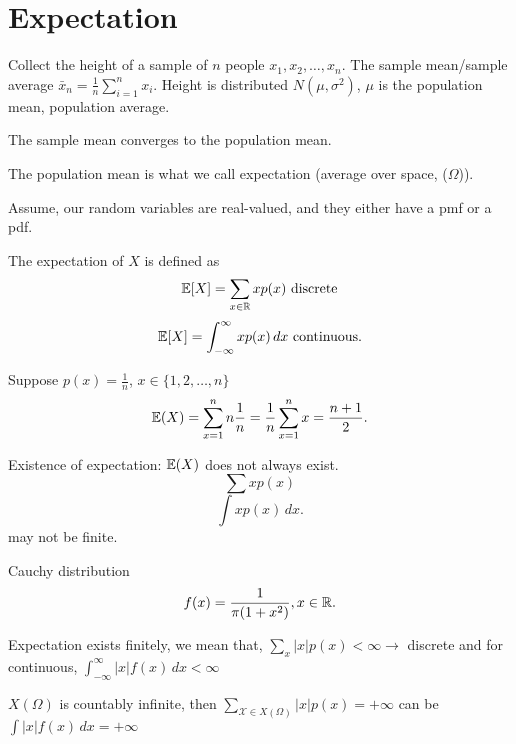 \documentclass[10pt, a4paper]{article}
\begin{document}
\newpage

\section{Expectation}
Collect the height of a sample of $n$ people $x_1, x_2, \dotsc, x_n$.
The sample mean/sample average $\bar{x}_n = \frac{1}{n}\sum_{i = 1}^{n}x_i$.
Height is distributed $N(\mu, \sigma ^ 2)$,
$\mu$ is the population mean, population average.

The sample mean converges to the population mean.

The population mean is what we call expectation
(average over space, ($\Omega$)).

Assume,
our random variables are real-valued,
and they either have a pmf or a pdf.

\begin{definition}
    The expectation of $X$ is defined as
    \[
    \mathbb{E}[X] = \sum_{x \in \mathbb{R}}xp(x)\text{ discrete}
    \]
    \[
    \mathbb{E}[X] = \int_{-\infty}^{\infty}xp(x)\,dx\text{ continuous}.
    \]
\end{definition}

Suppose $p(x) = \frac{1}{n}$, $x \in \{1, 2, \dotsc, n\}$
\[
\mathbb{E}(X) = \sum_{x = 1}^{n}n \frac{1}{n} = \frac{1}{n}\sum_{x = 1}^{n}x = \frac{n + 1}{2}.
\]

Existence of expectation:
$\mathbb{E}(X)$ does not always exist.
\[
\sum xp(x)
\]
\[
\int xp(x)\,dx.
\]
may not be finite.

Cauchy distribution
\[
f(x) = \frac{1}{\pi(1 + x ^ 2)}, x \in \mathbb{R}.
\]

Expectation exists finitely,
we mean that,
$\sum_{x}|x|p(x) < \infty \rightarrow$ discrete and for continuous,
$\int_{-\infty}^{\infty}|x|f(x)\,dx < \infty$

$X(\Omega)$ is countably infinite,
then $\sum_{\mathcal{X} \in X(\Omega)}|x|p(x) = +\infty$ can be
$\int|x|f(x)\,dx = +\infty$
\end{document}
